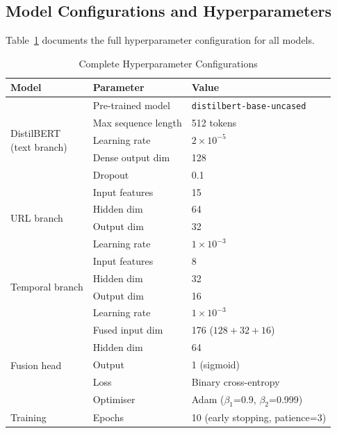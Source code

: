 \documentclass[conference]{IEEEtran}
\begin{document}
\subsection{Model Configurations and Hyperparameters}
\label{subsec:hyperparams}

Table~\ref{tab:hyperparams} documents the full hyperparameter configuration
for all models.

\begin{table}[t]
\centering
\caption{Complete Hyperparameter Configurations}
\label{tab:hyperparams}
\renewcommand{\arraystretch}{1.1}
\begin{tabular}{llp{4.0cm}}
\toprule
\textbf{Model} & \textbf{Parameter} & \textbf{Value} \\
\midrule
\multirow{5}{*}{\parbox{2.5cm}{DistilBERT\\(text branch)}}
  & Pre-trained model    & \texttt{distilbert-base-uncased} \\
  & Max sequence length  & 512 tokens \\
  & Learning rate        & $2 \times 10^{-5}$ \\
  & Dense output dim     & 128 \\
  & Dropout              & 0.1 \\
\midrule
\multirow{4}{*}{\parbox{2.5cm}{URL branch}}
  & Input features       & 15 \\
  & Hidden dim           & 64 \\
  & Output dim           & 32 \\
  & Learning rate        & $1 \times 10^{-3}$ \\
\midrule
\multirow{4}{*}{\parbox{2.5cm}{Temporal branch}}
  & Input features       & 8 \\
  & Hidden dim           & 32 \\
  & Output dim           & 16 \\
  & Learning rate        & $1 \times 10^{-3}$ \\
\midrule
\multirow{5}{*}{\parbox{2.5cm}{Fusion head}}
  & Fused input dim      & 176 ($128+32+16$) \\
  & Hidden dim           & 64 \\
  & Output               & 1 (sigmoid) \\
  & Loss                 & Binary cross-entropy \\
  & Optimiser            & Adam ($\beta_1$=0.9, $\beta_2$=0.999) \\
\midrule
\multirow{4}{*}{\parbox{2.5cm}{Training}}
  & Epochs               & 10 (early stopping, patience=3) \\

\end{tabular}
\end{table}
\end{document}
